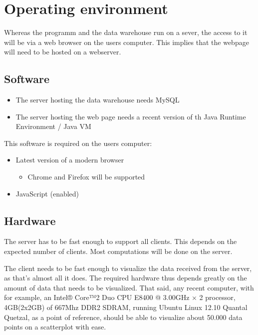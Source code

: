 \section{Operating environment}



Whereas the programm and the data warehouse run on a sever,
the access to it will be via a web browser on the users computer. 
This implies that the webpage will need to be hosted on a webserver.



\subsection{Software}
\begin{itemize}
  \item The server hosting the data warehouse needs  MySQL %
  
  \item The server hosting the web page needs a 
  recent version of th Java Runtime Environment / Java VM  %
\end{itemize}


This software is required on the users computer:
\begin{itemize}
  \item Latest version of a modern browser
  \begin{itemize}
    \item Chrome and Firefox will be supported
  \end{itemize}
  \item JavaScript (enabled)
\end{itemize}



\subsection{Hardware}

The server has to be fast enough to support all clients. This depends on
the expected number of clients. Most computations will be done on the server.

The client needs to be fast enough to visualize the data received from the server, as that's almost all it does.
The required hardware thus depends greatly on the amount of data that needs to be 
visualized. That said, any recent computer, with for example, 
an Intel® Core™2 Duo CPU E8400 @ 3.00GHz × 2 processor, 
4GB(2x2GB) of 667Mhz DDR2 SDRAM, running Ubuntu Linux 12.10 Quantal Quetzal, 
as a point of reference, should be able to visualize about 50.000 
data points on a scatterplot with ease.


